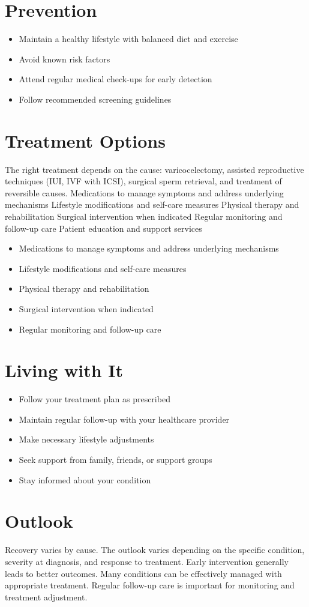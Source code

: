 \section{Prevention}
\begin{itemize}[noitemsep]
  \item Maintain a healthy lifestyle with balanced diet and exercise
  \item Avoid known risk factors
  \item Attend regular medical check-ups for early detection
  \item Follow recommended screening guidelines
\end{itemize}
\section{Treatment Options}
The right treatment depends on the cause: varicocelectomy, assisted reproductive techniques (IUI, IVF with ICSI), surgical sperm retrieval, and treatment of reversible causes. Medications to manage symptoms and address underlying mechanisms Lifestyle modifications and self-care measures Physical therapy and rehabilitation Surgical intervention when indicated Regular monitoring and follow-up care Patient education and support services

\begin{itemize}[noitemsep]
  \item Medications to manage symptoms and address underlying mechanisms
  \item Lifestyle modifications and self-care measures
  \item Physical therapy and rehabilitation
  \item Surgical intervention when indicated
  \item Regular monitoring and follow-up care
\end{itemize}
\section{Living with It}
\begin{itemize}[noitemsep]
  \item Follow your treatment plan as prescribed
  \item Maintain regular follow-up with your healthcare provider
  \item Make necessary lifestyle adjustments
  \item Seek support from family, friends, or support groups
  \item Stay informed about your condition
\end{itemize}
\section{Outlook}
Recovery varies by cause. The outlook varies depending on the specific condition, severity at diagnosis, and response to treatment. Early intervention generally leads to better outcomes. Many conditions can be effectively managed with appropriate treatment. Regular follow-up care is important for monitoring and treatment adjustment.
